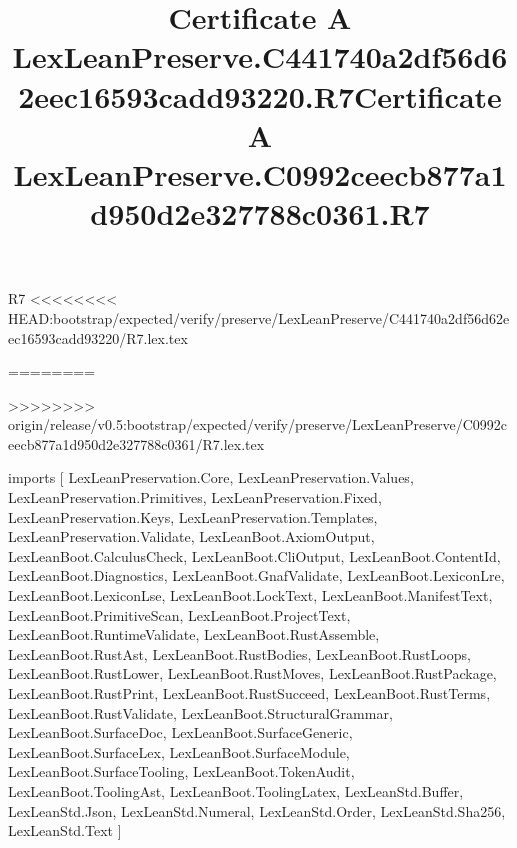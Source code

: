 \begin{lexlean}{R7}
<<<<<<<< HEAD:bootstrap/expected/verify/preserve/LexLeanPreserve/C441740a2df56d62eec16593cadd93220/R7.lex.tex
\title{Certificate A LexLeanPreserve.C441740a2df56d62eec16593cadd93220.R7}
========
\title{Certificate A LexLeanPreserve.C0992ceecb877a1d950d2e327788c0361.R7}
>>>>>>>> origin/release/v0.5:bootstrap/expected/verify/preserve/LexLeanPreserve/C0992ceecb877a1d950d2e327788c0361/R7.lex.tex
\begin{coremodule}
imports [
  LexLeanPreservation.Core,
  LexLeanPreservation.Values,
  LexLeanPreservation.Primitives,
  LexLeanPreservation.Fixed,
  LexLeanPreservation.Keys,
  LexLeanPreservation.Templates,
  LexLeanPreservation.Validate,
  LexLeanBoot.AxiomOutput,
  LexLeanBoot.CalculusCheck,
  LexLeanBoot.CliOutput,
  LexLeanBoot.ContentId,
  LexLeanBoot.Diagnostics,
  LexLeanBoot.GnafValidate,
  LexLeanBoot.LexiconLre,
  LexLeanBoot.LexiconLse,
  LexLeanBoot.LockText,
  LexLeanBoot.ManifestText,
  LexLeanBoot.PrimitiveScan,
  LexLeanBoot.ProjectText,
  LexLeanBoot.RuntimeValidate,
  LexLeanBoot.RustAssemble,
  LexLeanBoot.RustAst,
  LexLeanBoot.RustBodies,
  LexLeanBoot.RustLoops,
  LexLeanBoot.RustLower,
  LexLeanBoot.RustMoves,
  LexLeanBoot.RustPackage,
  LexLeanBoot.RustPrint,
  LexLeanBoot.RustSucceed,
  LexLeanBoot.RustTerms,
  LexLeanBoot.RustValidate,
  LexLeanBoot.StructuralGrammar,
  LexLeanBoot.SurfaceDoc,
  LexLeanBoot.SurfaceGeneric,
  LexLeanBoot.SurfaceLex,
  LexLeanBoot.SurfaceModule,
  LexLeanBoot.SurfaceTooling,
  LexLeanBoot.TokenAudit,
  LexLeanBoot.ToolingAst,
  LexLeanBoot.ToolingLatex,
  LexLeanStd.Buffer,
  LexLeanStd.Json,
  LexLeanStd.Numeral,
  LexLeanStd.Order,
  LexLeanStd.Sha256,
  LexLeanStd.Text
]


\end{coremodule}
\end{lexlean}
